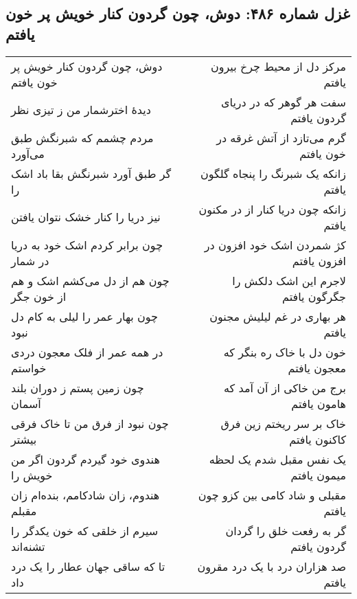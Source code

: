 \begin{center}
\section*{غزل شماره ۴۸۶: دوش، چون گردون کنار خویش پر خون یافتم}
\label{sec:486}
\begin{longtable}{l p{0.5cm} r}
دوش، چون گردون کنار خویش پر خون یافتم
&&
مرکز دل از محیط چرخ بیرون یافتم
\\
دیدهٔ اخترشمار من ز تیزی نظر
&&
سفت هر گوهر که در دریای گردون یافتم
\\
مردم چشمم که شبرنگش طبق می‌آورد
&&
گرم می‌تازد از آتش غرقه در خون یافتم
\\
گر طبق آورد شبرنگش بقا باد اشک را
&&
زانکه یک شبرنگ را پنجاه گلگون یافتم
\\
نیز دریا را کنار خشک نتوان یافتن
&&
زانکه چون دریا کنار از در مکنون یافتم
\\
چون برابر کردم اشک خود به دریا در شمار
&&
کژ شمردن اشک خود افزون در افزون یافتم
\\
چون هم از دل می‌کشم اشک و هم از خون جگر
&&
لاجرم این اشک دلکش را جگرگون یافتم
\\
چون بهار عمر را لیلی به کام دل نبود
&&
هر بهاری در غم لیلیش مجنون یافتم
\\
در همه عمر از فلک معجون دردی خواستم
&&
خون دل با خاک ره بنگر که معجون یافتم
\\
چون زمین پستم ز دوران بلند آسمان
&&
برج من خاکی از آن آمد که هامون یافتم
\\
چون نبود از فرق من تا خاک فرقی بیشتر
&&
خاک بر سر ریختم زین فرق کاکنون یافتم
\\
هندوی خود گیردم گردون اگر من خویش را
&&
یک نفس مقبل شدم یک لحظه میمون یافتم
\\
هندوم، زان شادکامم، بنده‌ام زان مقبلم
&&
مقبلی و شاد کامی بین کزو چون یافتم
\\
سیرم از خلقی که خون یکدگر را تشنه‌اند
&&
گر به رفعت خلق را گردان گردون یافتم
\\
تا که ساقی جهان عطار را یک درد داد
&&
صد هزاران درد با یک درد مقرون یافتم
\\
\end{longtable}
\end{center}

